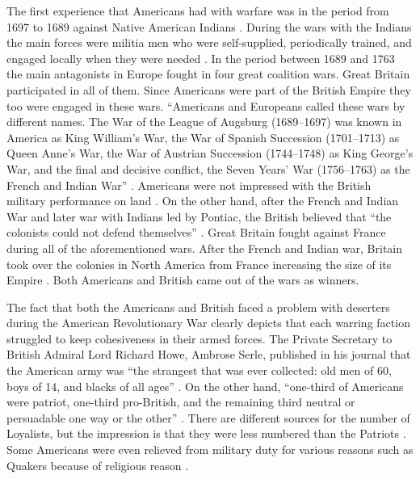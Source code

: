 The first experience that Americans had with warfare was in the period from 1697
to 1689 against Native American Indians \cite[p.1]{peckham_1964}.  During the wars with
the Indians the main forces were militia men who were self-supplied,
periodically trained, and engaged locally when they were needed
\cite[p.30]{stewart_2005}.
In the period between 1689 and 1763 the main antagonists in Europe fought in
four great coalition wars.  Great Britain participated in all of them. Since
Americans were part of the British Empire they too were engaged in these wars.
“Americans and Europeans called these wars by different names.  The War of the
League of Augsburg (1689–1697) was known in America as King William’s War, the
War of Spanish Succession (1701–1713) as Queen Anne’s War, the War of Austrian
Succession (1744–1748) as King George’s War, and the final and decisive
conflict, the Seven Years’ War (1756–1763) as the French and Indian War”
\cite[p.32]{stewart_2005}.  Americans were not impressed with the British military
performance on land \cite[p.34]{stewart_2005}.  On the other hand, after the French and
Indian War and later war with Indians led by Pontiac, the British believed that
“the colonists could not defend themselves” \cite[p.87]{ladenburg_causes_1989}.  Great Britain
fought against France during all of the aforementioned wars.  After the French
and Indian war, Britain took over the colonies in North America from France
increasing the size of its Empire \cite[p.87]{ladenburg_causes_1989}.  Both Americans and British
came out of the wars as winners.

The fact that both the Americans and British faced a problem with deserters
during the American Revolutionary War clearly depicts that each warring faction
struggled to keep cohesiveness in their armed forces.  The Private Secretary to
British Admiral Lord Richard Howe, Ambrose Serle, published in his journal that
the American army was “the strangest that was ever collected: old men of 60,
boys of 14, and blacks of all ages” \cite[p.20]{stephenson_patriot_2007}.  On the other hand,
“one-third of Americans were patriot, one-third pro-British, and the remaining
third neutral or persuadable one way or the other”
\cite[p.52]{stephenson_patriot_2007}.  There
are different sources for the number of Loyalists, but the impression is that
they were less numbered than the Patriots
\cite[p.199-203]{knollenberg_growth_2003}.  Some
Americans were even relieved from military duty for various reasons such as
Quakers because of religious reason \cite[p.51]{pancake_1985}.

